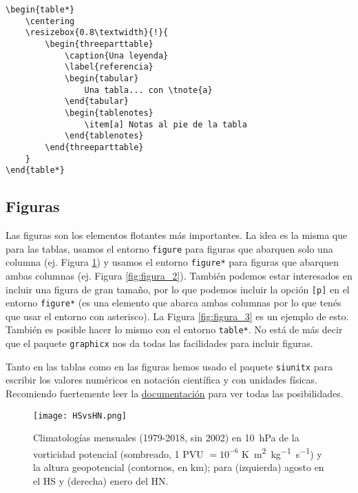 \documentclass[a4paper,10pt,twocolumn,twoside]{article}
\begin{document}
\begin{Verbatim}[fontsize=\fontsize{7pt}{7pt}\selectfont]
\begin{table*}
    \centering
    \resizebox{0.8\textwidth}{!}{
        \begin{threeparttable}
            \caption{Una leyenda}
            \label{referencia}
            \begin{tabular}
                Una tabla... con \tnote{a}
            \end{tabular}
            \begin{tablenotes}
                \item[a] Notas al pie de la tabla
            \end{tablenotes}
        \end{threeparttable}
    }
\end{table*}
\end{Verbatim}

\subsection{Figuras}
Las figuras son los elementos flotantes más importantes. La idea es la misma que para las tablas, usamos el entorno \texttt{figure} para figuras que abarquen solo una columna (ej. Figura \ref{fig:figura_1}) y usamos el entorno \texttt{figure*} para figuras que abarquen ambas columnas (ej. Figura \ref{fig:figura_2}). También podemos estar interesados en incluir una figura de gran tamaño, por lo que podemos incluir la opción \texttt{[p]} en el entorno \texttt{figure*} (es una elemento que abarca ambas columnas por lo que tenés que usar el entorno con asterisco). La Figura \ref{fig:figura_3} es un ejemplo de esto. También es posible hacer lo mismo con el entorno \texttt{table*}. No está de más decir que el paquete \texttt{graphicx} nos da todas las facilidades para incluir figuras.

Tanto en las tablas como en las figuras hemos usado el paquete \texttt{siunitx} para escribir los valores numéricos en notación científica y con unidades físicas. Recomiendo fuertemente leer la \href{https://ctan.dcc.uchile.cl/macros/latex/contrib/siunitx/siunitx.pdf}{documentación} para ver todas las posibilidades.

\begin{figure}[b]
    \centering
    \texttt{[image: HSvsHN.png]}
    \caption{Climatologías mensuales (1979-2018, sin 2002) en \SI{10}{\hecto\Pa} de la vorticidad potencial (sombreado, 1 PVU $= 10^{-6}$ \si{K.m^2.kg^{-1}.s^{-1}}) y la altura geopotencial (contornos, en \si{\km}); para (izquierda) agosto en el HS y (derecha) enero del HN.}
    \label{fig:figura_1}
\end{figure}
\end{document}
